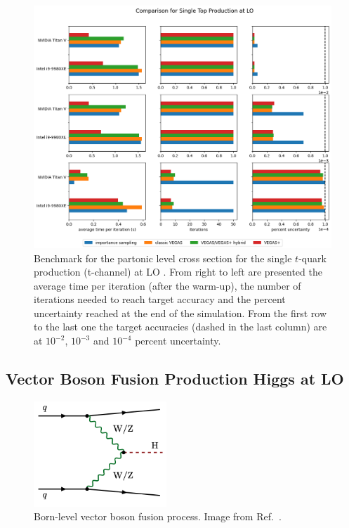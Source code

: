 \documentclass[../main/main.tex]{subfiles}
\begin{document}
\begin{figure}[]
	\centering
	\includegraphics[width=\textwidth]{../images/singletop_final.png}
	\caption{Benchmark  for the partonic level cross section for the single $t$-quark production (t-channel)  at LO \cite{Brucherseifer_2014}. From right to left are presented the average time per iteration (after the warm-up), the number of iterations needed to reach target accuracy and the percent uncertainty reached at the end of the simulation. From the first row to the last one the target accuracies (dashed in the last column) are at $10^{-2}$, $10^{-3}$ and $10^{-4}$ percent uncertainty.}
	\label{singletop_plot}
\end{figure}
 
\subsection{Vector Boson Fusion Production Higgs at LO}

\begin{figure}[]
	\centering
	\includegraphics[width=5cm]{../images/vfb_image.png}
	\caption{ Born-level vector boson fusion process. Image from Ref.~\cite{Cruz_Martinez_2018}.}
	\label{vfb}
\end{figure}
\end{document}
